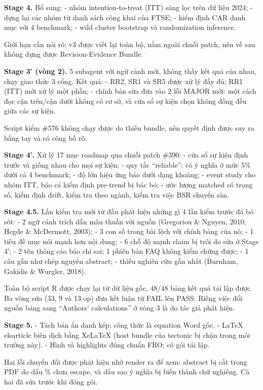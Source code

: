 \documentclass[12pt,a4paper]{article}
\begin{document}
\textbf{Stage 4.} Bổ sung: - nhóm intention-to-treat (ITT) sàng lọc trên
dữ liệu 2024; - dựng lại các nhóm từ danh sách công khai của FTSE; -
kiểm định CAR danh mục với 4 benchmark; - wild cluster bootstrap và
randomization inference.

Giới hạn cần nói rõ: v3 được viết lại toàn bộ, nằm ngoài chuỗi patch,
nên về sau không dựng được Revision-Evidence Bundle.

\textbf{Stage 3′ (vòng 2).} 5 subagent với ngữ cảnh mới, không thấy kết
quả của nhau, chạy giao thức 3 cổng. Kết quả: - RR2, SR1 và SR5 được xử
lý đầy đủ; RR1 (ITT) mới xử lý một phần; - chính bản sửa đưa vào 2 lỗi
MAJOR mới: một cách đọc cận trên/cận dưới không có cơ sở, và cửa sổ sự
kiện chọn không đồng đều giữa các sự kiện.

Script kiểm \#576 không chạy được do thiếu bundle, nên quyết định được
suy ra bằng tay và có công bố rõ.

\textbf{Stage 4′.} Xử lý 17 mục roadmap qua chuỗi patch \#390: - cửa sổ
sự kiện định trước và giống nhau cho mọi sự kiện; - quy tắc
``reliable'': có ý nghĩa ở mức 5\% dưới cả 4 benchmark; - độ lớn hiệu
ứng báo dưới dạng khoảng; - event study cho nhóm ITT, báo cả kiểm định
pre-trend bị bác bỏ; - ước lượng matched có trọng số, kiểm định drift,
kiểm tra theo ngành, kiểm tra việc BSR chuyển sàn.

\textbf{Stage 4.5.} Lần kiểm tra mới từ đầu phát hiện những gì 4 lần
kiểm trước đã bỏ sót: - 2 ngữ cảnh trích dẫn mâu thuẫn với nguồn
(Gregoriou \& Nguyen, 2010; Hegde \& McDermott, 2003); - 3 con số trong
bài lệch với chính bảng của nó; - 1 tiêu đề mục nói mạnh hơn nội dung; -
6 chỗ độ mạnh claim bị trôi do sửa ở Stage 4′; - 2 tên thông cáo báo chí
sai; 1 phiên bản FAQ không kiểm chứng được; - 1 câu gần như chép nguyên
abstract; - thiếu nghiên cứu gần nhất (Burnham, Gakidis \& Wurgler,
2018).

Toàn bộ script R được chạy lại từ dữ liệu gốc, 48/48 bảng kết quả tái
lập được. Ba vòng sửa (33, 9 và 13 op) đưa kết luận từ FAIL lên PASS.
Riêng việc đổi nguồn bảng sang ``Authors' calculations'' ở vòng 3 là do
tác giả phát hiện.

\textbf{Stage 5.} - Tách bản ẩn danh kép; công thức là equation Word
gốc. - LaTeX elsarticle biên dịch bằng XeLaTeX (host bundle của tectonic
bị chặn trong môi trường này). - Hình và highlights đúng chuẩn FRO; có
gói tái lập.

Hai lỗi chuyển đổi được phát hiện nhờ render ra để xem: abstract bị cắt
trong PDF do dấu \% chưa escape, và dấu sao ý nghĩa bị biến thành chữ
nghiêng. Cả hai đã sửa trước khi đóng gói.
\end{document}

